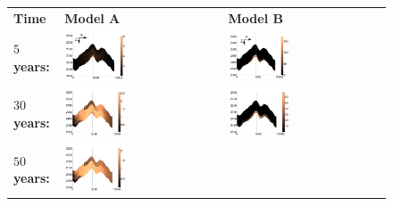 \begin{figure}
\begin{tabular}{MMM}
\textbf{Time} & \textbf{Model A} & \textbf{Model B}\\
\textbf{$5$ years:}&
\includegraphics[width=0.4\textwidth]{./figurer/C02222p5_slcy}&
\includegraphics[width=0.4\textwidth]{./figurer/C03211p5_slcy}\\
\textbf{$30$ years:}&
\includegraphics[width=0.4\textwidth]{./figurer/C02222p30_slcy}&
\includegraphics[width=0.4\textwidth]{./figurer/C03211p30_slcy}\\
\textbf{$50$ years:}&
\includegraphics[width=0.4\textwidth]{./figurer/C02222p50_slcy}&

\end{tabular}
\end{figure}

